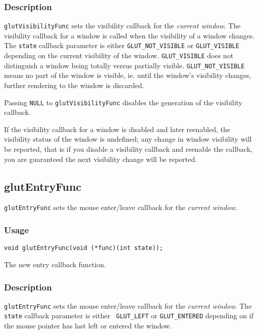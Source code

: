 \subsubsection*{Description}

{\tt glutVisibilityFunc} sets the visibility callback for the {\em
current window}.  The visibility callback for a window is called when
the visibility of a window changes.  The {\tt state} callback parameter
is either {\tt GLUT\_NOT\_VISIBLE} or {\tt GLUT\_VISIBLE} depending on
the current visibility of the window.  {\tt GLUT\_VISIBLE} does not
distinguish a window being totally versus partially visible.  {\tt GLUT\_NOT\_VISIBLE}
means no part of the window is visible, ie. until the window's visibility changes,
further rendering to the window is discarded.

Passing {\tt NULL} to {\tt glutVisibilityFunc}
disables the generation of the visibility callback.

If the visibility callback for a window is
disabled and later reenabled, the visibility status of the window is
undefined; any change in window visibility will be reported, that is
if you disable a visibility callback and reenable the callback, you
are guaranteed the next visibility change will be reported.

\subsection{glutEntryFunc}

{\tt glutEntryFunc} sets the mouse enter/leave callback for the {\em
current window}.

\subsubsection*{Usage}
\begin{verbatim}
void glutEntryFunc(void (*func)(int state));
\end{verbatim}
\begin{description}
\itemsep 0in
\item[\tt func]
The new entry callback function.
\end{description}

\subsubsection*{Description}

{\tt glutEntryFunc} sets the mouse enter/leave callback for the {\em
current window}.  The {\tt state} callback parameter is either {\tt
GLUT\_LEFT} or {\tt GLUT\_ENTERED} depending on if the mouse pointer
has last left or entered the window.

